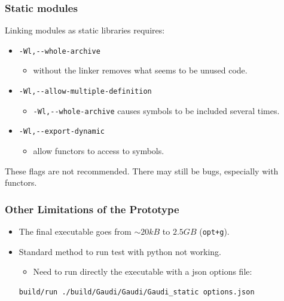 \documentclass{beamer}
\begin{document}
    \begin{frame}[fragile]
        \frametitle{Static modules}

        Linking modules as static libraries requires:
        \begin{itemize}
            \item \verb'-Wl,--whole-archive'
            \begin{itemize}
                \item without the linker removes what seems to be unused code.
            \end{itemize}
            \item \verb'-Wl,--allow-multiple-definition'
            \begin{itemize}
                \item \verb'-Wl,--whole-archive' causes symbols to be included several times.
            \end{itemize}
            \item \verb'-Wl,--export-dynamic'
            \begin{itemize}
                \item allow functors to access to symbols.
            \end{itemize}
        \end{itemize}

        These flags are not recommended.
        There may still be bugs, especially with functors.
    \end{frame}

    \begin{frame}[fragile]
        \frametitle{Other Limitations of the Prototype}

        \begin{itemize}
            \item The final executable goes from $ \sim 20 kB $ to $ 2.5 GB $ (\verb'opt+g').
            \item Standard method to run test with python not working.
            \begin{itemize}
                \item Need to run directly the executable with a json options file:
            \end{itemize}
            \begin{lstlisting}[language=bash,basicstyle=\scriptsize,breaklines]
build/run ./build/Gaudi/Gaudi/Gaudi_static options.json
            \end{lstlisting}
        \end{itemize}
    \end{frame}
\end{document}
